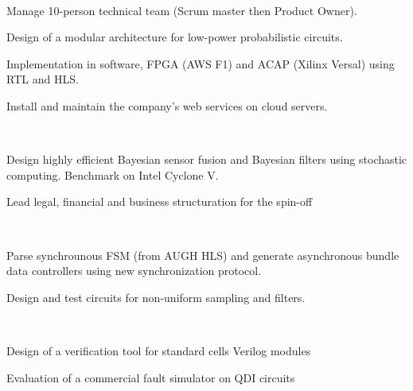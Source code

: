 \documentclass[a4paper]{MagicalCV}
\begin{document}
\begin{minipage}[t]{0.67\textwidth} 


 \\
\begin{tightemize}
\item Manage 10-person technical team (Scrum master then Product Owner).
\item Design of a modular architecture for low-power probabilistic circuits.
\item Implementation in software, FPGA (AWS F1) and ACAP (Xilinx Versal)
  using RTL and HLS.
\item Install and maintain the company's web services on cloud servers.
\end{tightemize}
\sectionsep

 \\
\begin{tightemize}
\item Design highly efficient Bayesian sensor fusion and Bayesian filters
  using stochastic computing. Benchmark on Intel Cyclone V.
\item Lead legal, financial and business structuration for the spin-off
\end{tightemize}
\sectionsep

 \\
\vspace{\topsep} %
\begin{tightemize}
\item Parse synchrounous FSM (from AUGH HLS) and generate asynchronous bundle data
  controllers using new synchronization protocol.
\item Design and test circuits for non-uniform sampling and filters. 
\end{tightemize}
\sectionsep

 \\
\vspace{\topsep} %
\begin{tightemize}
\item Design of a verification tool for standard cells Verilog modules
\item Evaluation of a commercial fault simulator on QDI circuits
\end{tightemize}
\sectionsep


\end{minipage}
\end{document}
